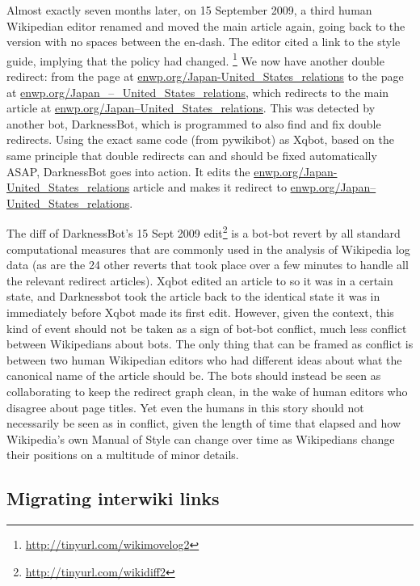 \documentclass[format=acmsmall, review=false, screen=true]{acmart}%
\begin{document}
Almost exactly seven months later, on 15 September 2009, a third human Wikipedian editor renamed and moved the main article again, going back to the version with no spaces between the en-dash. The editor cited a link to the style guide, implying that the policy had changed. \footnote{ \url{http://tinyurl.com/wikimovelog2} } We now have another double redirect: from the page at \url{enwp.org/Japan-United\_States\_relations} to the page at \href{http://enwp.org/Japan\_–\_United\_States\_relations}{enwp.org/Japan\_–\_United\_States\_relations}, which redirects to the main article at \href{http://enwp.org/Japan–United\_States\_relations}{enwp.org/Japan–United\_States\_relations}. This was detected by another bot, DarknessBot, which is programmed to also find and fix double redirects. Using the exact same code (from pywikibot) as Xqbot, based on the same principle that double redirects can and should be fixed automatically ASAP, DarknessBot goes into action. It edits the \url{enwp.org/Japan-United\_States\_relations} article and makes it redirect to \href{http://enwp.org/Japan–United\_States\_relations}{enwp.org/Japan–United\_States\_relations}.

The diff of DarknessBot's 15 Sept 2009 edit\footnote{ \url{http://tinyurl.com/wikidiff2} } is a bot-bot revert by all standard computational measures that are commonly used in the analysis of Wikipedia log data (as are the 24 other reverts that took place over a few minutes to handle all the relevant redirect articles). Xqbot edited an article to so it was in a certain state, and Darknessbot took the article back to the identical state it was in immediately before Xqbot made its first edit. However, given the context, this kind of event should not be taken as a sign of bot-bot conflict, much less conflict between Wikipedians about bots. The only thing that can be framed as conflict is between two human Wikipedian editors who had different ideas about what the canonical name of the article should be. The bots should instead be seen as collaborating to keep the redirect graph clean, in the wake of human editors who disagree about page titles. Yet even the humans in this story should not necessarily be seen as in conflict, given the length of time that elapsed and how Wikipedia's own Manual of Style can change over time as Wikipedians change their positions on a multitude of minor details.

\subsection{Migrating interwiki links} \label{s:qualdesc:interwiki}
\end{document}
